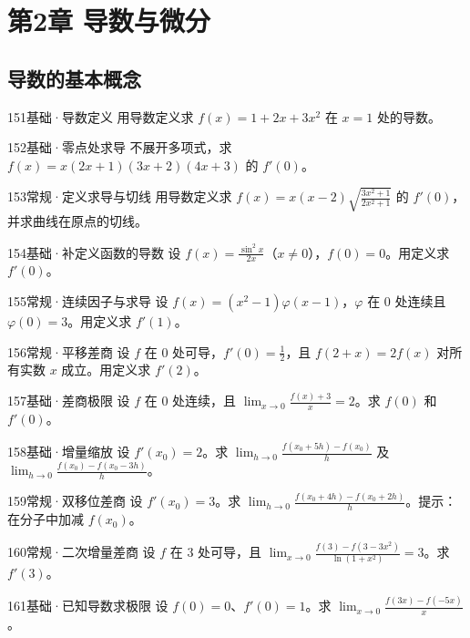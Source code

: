 \section{第2章 导数与微分}
\subsection{导数的基本概念}
\begin{exercise}{151}{基础·导数定义}
用导数定义求 $f(x)=1+2x+3x^2$ 在 $x=1$ 处的导数。
\end{exercise}
\begin{exercise}{152}{基础·零点处求导}
不展开多项式，求 $f(x)=x(2x+1)(3x+2)(4x+3)$ 的 $f'(0)$。
\end{exercise}
\begin{exercise}{153}{常规·定义求导与切线}
用导数定义求 $f(x)=x(x-2)\sqrt{\frac{3x^2+1}{2x^2+1}}$ 的 $f'(0)$，并求曲线在原点的切线。
\end{exercise}
\begin{exercise}{154}{基础·补定义函数的导数}
设 $f(x)=\frac{\sin^2x}{2x}$（$x\ne0$），$f(0)=0$。用定义求 $f'(0)$。
\end{exercise}
\begin{exercise}{155}{常规·连续因子与求导}
设 $f(x)=(x^2-1)\varphi(x-1)$，$\varphi$ 在 $0$ 处连续且 $\varphi(0)=3$。用定义求 $f'(1)$。
\end{exercise}
\begin{exercise}{156}{常规·平移差商}
设 $f$ 在 $0$ 处可导，$f'(0)=\frac{1}{2}$，且 $f(2+x)=2f(x)$ 对所有实数 $x$ 成立。用定义求 $f'(2)$。
\end{exercise}
\begin{exercise}{157}{基础·差商极限}
设 $f$ 在 $0$ 处连续，且 $\lim_{x\to0}\frac{f(x)+3}{x}=2$。求 $f(0)$ 和 $f'(0)$。
\end{exercise}
\begin{exercise}{158}{基础·增量缩放}
设 $f'(x_0)=2$。求 $\lim_{h\to0}\frac{f(x_0+5h)-f(x_0)}{h}$ 及 $\lim_{h\to0}\frac{f(x_0)-f(x_0-3h)}{h}$。
\end{exercise}
\begin{exercise}{159}{常规·双移位差商}
设 $f'(x_0)=3$。求 $\lim_{h\to0}\frac{f(x_0+4h)-f(x_0+2h)}{h}$。提示：在分子中加减 $f(x_0)$。
\end{exercise}
\begin{exercise}{160}{常规·二次增量差商}
设 $f$ 在 $3$ 处可导，且 $\lim_{x\to0}\frac{f(3)-f(3-3x^2)}{\ln(1+x^2)}=3$。求 $f'(3)$。
\end{exercise}
\begin{exercise}{161}{基础·已知导数求极限}
设 $f(0)=0$、$f'(0)=1$。求 $\lim_{x\to0}\frac{f(3x)-f(-5x)}{x}$。
\end{exercise}
